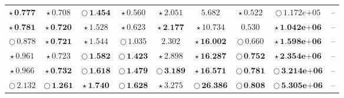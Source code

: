 \documentclass[
]{article}
\begin{document}
\begin{table}[!h]
\begin{tabular}[t]{ccccccccc}
\cellcolor[HTML]{DF536B}$\star\,\textbf{0.777}$ & \cellcolor[HTML]{2297E6}$\star\,\textit{0.708}$ & \cellcolor[HTML]{DF536B}$\bigcirc\,\textbf{1.454}$ & \cellcolor[HTML]{2297E6}$\star\,\textit{0.560}$ & \cellcolor[HTML]{F5C710}$\star\,\textit{2.051}$ & \cellcolor[HTML]{FFFFFF}$5.682$ & \cellcolor[HTML]{DF536B}$\star\,\textit{0.522}$ & \cellcolor[HTML]{F5C710}$\bigcirc\,\textit{1.172e+05}$ & --\\
\cellcolor[HTML]{2297E6}$\star\,\textbf{0.781}$ & \cellcolor[HTML]{2297E6}$\star\,\textbf{0.720}$ & \cellcolor[HTML]{2297E6}$\star\,\textit{1.528}$ & \cellcolor[HTML]{DF536B}$\star\,\textit{0.623}$ & \cellcolor[HTML]{F5C710}$\star\,\textbf{2.177}$ & \cellcolor[HTML]{F5C710}$\star\,\textit{10.734}$ & \cellcolor[HTML]{FFFFFF}$0.530$ & \cellcolor[HTML]{DF536B}$\star\,\textbf{1.042e+06}$ & --\\
\cellcolor[HTML]{DF536B}$\bigcirc\,\textit{0.878}$ & \cellcolor[HTML]{DF536B}$\star\,\textbf{0.721}$ & \cellcolor[HTML]{DF536B}$\star\,\textit{1.544}$ & \cellcolor[HTML]{FFFFFF}$\bigcirc\,1.035$ & \cellcolor[HTML]{FFFFFF}$2.302$ & \cellcolor[HTML]{2297E6}$\star\,\textbf{16.002}$ & \cellcolor[HTML]{FFFFFF}$\bigcirc\,0.660$ & \cellcolor[HTML]{2297E6}$\star\,\textbf{1.598e+06}$ & --\\
\cellcolor[HTML]{2297E6}$\star\,\textit{0.961}$ & \cellcolor[HTML]{DF536B}$\star\,\textit{0.723}$ & \cellcolor[HTML]{2297E6}$\bigcirc\,\textbf{1.582}$ & \cellcolor[HTML]{2297E6}$\bigcirc\,\textbf{1.423}$ & \cellcolor[HTML]{2297E6}$\star\,\textit{2.898}$ & \cellcolor[HTML]{DF536B}$\star\,\textbf{16.287}$ & \cellcolor[HTML]{2297E6}$\bigcirc\,\textbf{0.752}$ & \cellcolor[HTML]{F5C710}$\star\,\textbf{2.354e+06}$ & --\\
\cellcolor[HTML]{DF536B}$\star\,\textit{0.966}$ & \cellcolor[HTML]{F5C710}$\star\,\textbf{0.732}$ & \cellcolor[HTML]{F5C710}$\bigcirc\,\textbf{1.618}$ & \cellcolor[HTML]{F5C710}$\bigcirc\,\textbf{1.479}$ & \cellcolor[HTML]{DF536B}$\bigcirc\,\textbf{3.189}$ & \cellcolor[HTML]{F5C710}$\star\,\textbf{16.571}$ & \cellcolor[HTML]{DF536B}$\bigcirc\,\textbf{0.781}$ & \cellcolor[HTML]{F5C710}$\bigcirc\,\textbf{3.214e+06}$ & --\\
\cellcolor[HTML]{FFFFFF}$\bigcirc\,2.132$ & \cellcolor[HTML]{2297E6}$\bigcirc\,\textbf{1.261}$ & \cellcolor[HTML]{F5C710}$\star\,\textbf{1.740}$ & \cellcolor[HTML]{DF536B}$\bigcirc\,\textbf{1.628}$ & \cellcolor[HTML]{DF536B}$\star\,\textit{3.275}$ & \cellcolor[HTML]{DF536B}$\bigcirc\,\textbf{26.386}$ & \cellcolor[HTML]{F5C710}$\bigcirc\,\textbf{0.808}$ & \cellcolor[HTML]{DF536B}$\bigcirc\,\textbf{5.305e+06}$ & --\\

\end{tabular}
\end{table}
\end{document}
